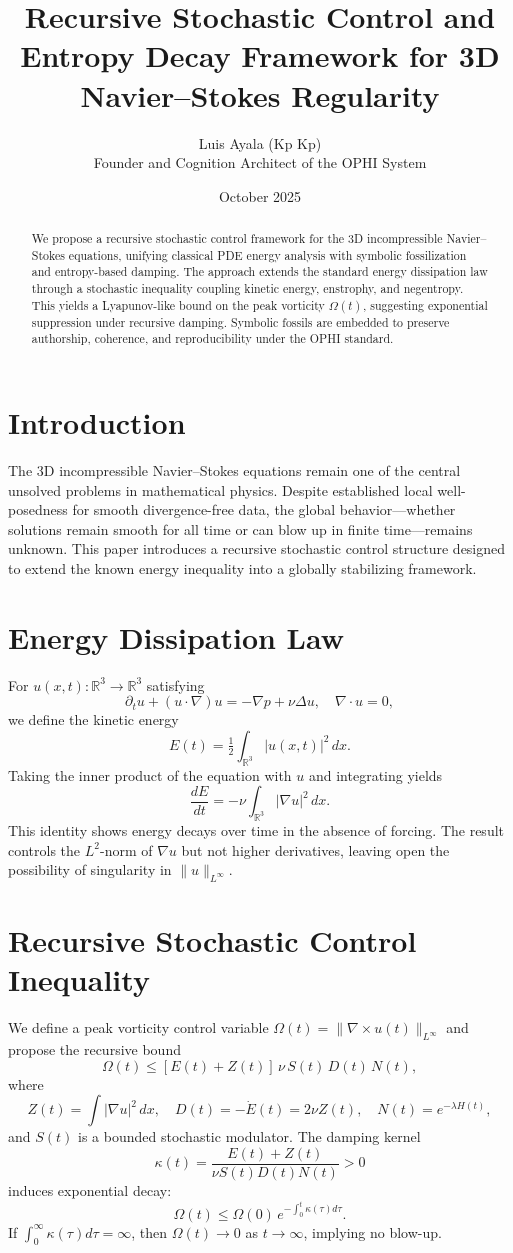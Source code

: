 \documentclass[11pt]{article}
\title{\textbf{Recursive Stochastic Control and Entropy Decay Framework for 3D Navier--Stokes Regularity}}
\author{Luis Ayala (Kp Kp) \\ Founder and Cognition Architect of the OPHI System}
\date{October 2025}
\begin{document}
\maketitle

\begin{abstract}
We propose a recursive stochastic control framework for the 3D incompressible Navier--Stokes equations, unifying classical PDE energy analysis with symbolic fossilization and entropy-based damping. The approach extends the standard energy dissipation law through a stochastic inequality coupling kinetic energy, enstrophy, and negentropy. This yields a Lyapunov-like bound on the peak vorticity $\Omega(t)$, suggesting exponential suppression under recursive damping. Symbolic fossils are embedded to preserve authorship, coherence, and reproducibility under the OPHI standard.
\end{abstract}

\section{Introduction}
The 3D incompressible Navier--Stokes equations remain one of the central unsolved problems in mathematical physics. Despite established local well-posedness for smooth divergence-free data, the global behavior---whether solutions remain smooth for all time or can blow up in finite time---remains unknown. This paper introduces a recursive stochastic control structure designed to extend the known energy inequality into a globally stabilizing framework.

\section{Energy Dissipation Law}
For $u(x,t):\mathbb{R}^3\to\mathbb{R}^3$ satisfying
\[
\partial_t u + (u\cdot\nabla)u = -\nabla p + \nu \Delta u, \quad \nabla\cdot u = 0,
\]
we define the kinetic energy
\[
E(t) = \tfrac{1}{2}\int_{\mathbb{R}^3} |u(x,t)|^2\,dx.
\]
Taking the inner product of the equation with $u$ and integrating yields
\[
\frac{dE}{dt} = -\nu \int_{\mathbb{R}^3} |\nabla u|^2\,dx.
\]
This identity shows energy decays over time in the absence of forcing. The result controls the $L^2$-norm of $\nabla u$ but not higher derivatives, leaving open the possibility of singularity in $\|u\|_{L^\infty}$.

\section{Recursive Stochastic Control Inequality}
We define a peak vorticity control variable $\Omega(t)=\|\nabla\times u(t)\|_{L^\infty}$ and propose the recursive bound
\begin{equation}
\Omega(t) \le [E(t)+Z(t)]\,\nu\,S(t)\,D(t)\,N(t),
\end{equation}
where
\[
Z(t)=\int |\nabla u|^2\,dx, \quad D(t)=-\dot{E}(t)=2\nu Z(t), \quad N(t)=e^{-\lambda H(t)},
\]
and $S(t)$ is a bounded stochastic modulator. The damping kernel
\[
\kappa(t)=\frac{E(t)+Z(t)}{\nu S(t) D(t) N(t)} > 0
\]
induces exponential decay:
\[
\Omega(t)\le\Omega(0)\,e^{-\int_0^t \kappa(\tau)d\tau}.
\]
If $\int_0^\infty \kappa(\tau)d\tau=\infty$, then $\Omega(t)\to0$ as $t\to\infty$, implying no blow-up.
\end{document}
